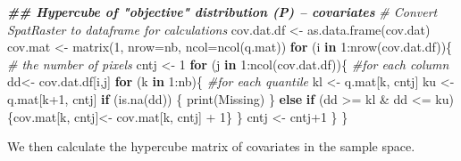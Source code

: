 \documentclass[
  10pt,
  b5paper,
  oneside]{book}
\newenvironment{Shaded}{\begin{snugshade}}{\end{snugshade}}
\newcommand{\AttributeTok}[1]{\textcolor[rgb]{0.77,0.63,0.00}{#1}}
\newcommand{\CommentTok}[1]{\textcolor[rgb]{0.56,0.35,0.01}{\textit{#1}}}
\newcommand{\ControlFlowTok}[1]{\textcolor[rgb]{0.13,0.29,0.53}{\textbf{#1}}}
\newcommand{\DecValTok}[1]{\textcolor[rgb]{0.00,0.00,0.81}{#1}}
\newcommand{\DocumentationTok}[1]{\textcolor[rgb]{0.56,0.35,0.01}{\textbf{\textit{#1}}}}
\newcommand{\FunctionTok}[1]{\textcolor[rgb]{0.00,0.00,0.00}{#1}}
\newcommand{\NormalTok}[1]{#1}
\newcommand{\OtherTok}[1]{\textcolor[rgb]{0.56,0.35,0.01}{#1}}
\newcommand{\SpecialCharTok}[1]{\textcolor[rgb]{0.00,0.00,0.00}{#1}}
\newcommand{\StringTok}[1]{\textcolor[rgb]{0.31,0.60,0.02}{#1}}
\begin{document}
\begin{Shaded}
\begin{Highlighting}[]
\DocumentationTok{\#\# Hypercube of "objective" distribution (P) – covariates}
  \CommentTok{\# Convert SpatRaster to dataframe for calculations}
\NormalTok{    cov.dat.df }\OtherTok{\textless{}{-}} \FunctionTok{as.data.frame}\NormalTok{(cov.dat) }
\NormalTok{    cov.mat }\OtherTok{\textless{}{-}} \FunctionTok{matrix}\NormalTok{(}\DecValTok{1}\NormalTok{, }\AttributeTok{nrow=}\NormalTok{nb, }\AttributeTok{ncol=}\FunctionTok{ncol}\NormalTok{(q.mat))}
      \ControlFlowTok{for}\NormalTok{ (i }\ControlFlowTok{in} \DecValTok{1}\SpecialCharTok{:}\FunctionTok{nrow}\NormalTok{(cov.dat.df))\{ }\CommentTok{\# the number of pixels}
\NormalTok{        cntj }\OtherTok{\textless{}{-}} \DecValTok{1} 
      \ControlFlowTok{for}\NormalTok{ (j }\ControlFlowTok{in} \DecValTok{1}\SpecialCharTok{:}\FunctionTok{ncol}\NormalTok{(cov.dat.df))\{ }\CommentTok{\#for each column}
\NormalTok{        dd}\OtherTok{\textless{}{-}}\NormalTok{ cov.dat.df[i,j]  }
        \ControlFlowTok{for}\NormalTok{ (k }\ControlFlowTok{in} \DecValTok{1}\SpecialCharTok{:}\NormalTok{nb)\{  }\CommentTok{\#for each quantile}
\NormalTok{          kl }\OtherTok{\textless{}{-}}\NormalTok{ q.mat[k, cntj] }
\NormalTok{          ku }\OtherTok{\textless{}{-}}\NormalTok{ q.mat[k}\SpecialCharTok{+}\DecValTok{1}\NormalTok{, cntj] }
          \ControlFlowTok{if}\NormalTok{ (}\FunctionTok{is.na}\NormalTok{(dd)) \{}
            \FunctionTok{print}\NormalTok{(}\StringTok{\textquotesingle{}Missing\textquotesingle{}}\NormalTok{)}
\NormalTok{          \}}
          \ControlFlowTok{else} \ControlFlowTok{if}\NormalTok{ (dd }\SpecialCharTok{\textgreater{}=}\NormalTok{ kl }\SpecialCharTok{\&}\NormalTok{ dd }\SpecialCharTok{\textless{}=}\NormalTok{ ku)\{cov.mat[k, cntj]}\OtherTok{\textless{}{-}}\NormalTok{ cov.mat[k, cntj] }\SpecialCharTok{+} \DecValTok{1}\NormalTok{\} }
\NormalTok{        \}}
\NormalTok{        cntj }\OtherTok{\textless{}{-}}\NormalTok{ cntj}\SpecialCharTok{+}\DecValTok{1}
\NormalTok{      \}}
\NormalTok{    \}}
\end{Highlighting}
\end{Shaded}

We then calculate the hypercube matrix of covariates in the sample space.
\end{document}
